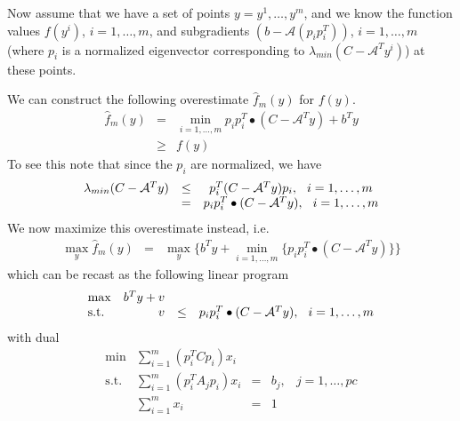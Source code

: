 \documentclass[12pt]{kluwer}
\begin{document}
\begin{article}
Now assume that we have a set of
points $y = y^1,\ldots,y^m$, and we know the function values $f(y^i)$, $i=1,\ldots,m$,
and subgradients $(b-\mathcal{A}(p_ip_i^T))$, $i=1,\ldots,m$ (where $p_i$ is
a normalized eigenvector corresponding to $\lambda_{min}(C-\mathcal{A}^Ty^i)$)
at these points.

We can construct the following overestimate $\hat{f}_m(y)$ for $f(y)$.
\begin{displaymath}
\begin{array}{ccc}
\hat{f}_m(y) & = & \min_{i=1,\ldots,m} p_ip_i^T \bullet (C-\mathcal{A}^Ty) + b^Ty \\
& \ge & f(y)
\end{array}
\end{displaymath}
To see this note that since the $p_i$ are normalized, we have
\begin{displaymath}
\begin{array}{ccc}
\lambda_{min}(C-\mathcal{A}^Ty) & \le & p_i^T(C-\mathcal{A}^Ty)p_i, \hspace*{0.25cm} i=1,\ldots,m \\
& = & p_ip_i^T \bullet (C-\mathcal{A}^Ty), \hspace*{0.25cm} i=1,\ldots,m
\end{array}
\end{displaymath}
We now maximize this overestimate instead, i.e.
\begin{displaymath}
\begin{array}{ccc}
\max_y \hat{f}_m(y) & = & \max_y \{b^Ty + \min_{i=1,\ldots,m} \{p_ip_i^T \bullet (C-\mathcal{A}^Ty) \} \}
\end{array}
\end{displaymath}
which can be recast as the following linear program
\begin{equation}
\label{lp_subproblem_dual}
\begin{array}{lrcc}
\max & b^Ty + v \\
\mbox{s.t.} & v & \le & p_ip_i^T \bullet (C-\mathcal{A}^Ty), \hspace*{0.25cm} i=1,\ldots,m
\end{array}
\end{equation}
with dual
\begin{equation}
\label{lp_subproblem_primal}
\begin{array}{lrccc}
\min & \sum_{i=1}^m(p_i^TCp_i)x_i \\
\mbox{s.t.} & \sum_{i=1}^m(p_i^TA_jp_i)x_i & = & b_j, & j=1,\ldots,pc \\
& \sum_{i=1}^mx_i & = & 1 \\

\end{array}
\end{equation}
\end{article}
\end{document}
